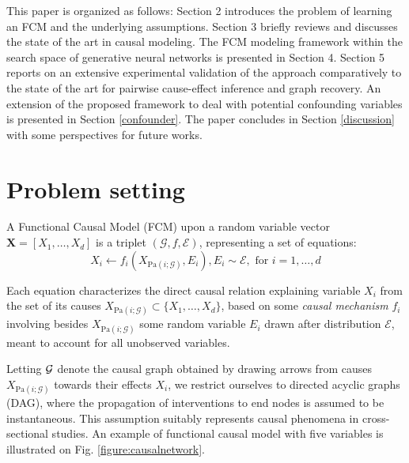 \documentclass[a4paper, 11pt]{article}
\newcommand{\Pa}[1]{\text{Pa}({#1}; \mathcal{G})}
\begin{document}
This paper is organized as follows: Section 2 introduces the problem of learning an FCM and the underlying assumptions. Section 3 briefly reviews and discusses the state of the art in causal modeling. The FCM modeling framework within the search space of generative neural networks is presented in Section 4. Section 5 reports on an extensive experimental validation of the approach comparatively to the state of the art for pairwise cause-effect inference and graph recovery. An extension of the proposed framework to deal with potential confounding variables is presented in Section \ref{confounder}. The paper concludes in Section \ref{discussion} with some perspectives for future works.



\section{Problem setting \label{ProblemSettings}}\label{sec:setting}

A Functional Causal Model (FCM) upon a random variable vector $\textbf{X} = [X_1, \ldots, X_d]$ is a triplet $(\mathcal{G}, f, \mathcal{E})$, representing a set of equations: 
\begin{equation}   {X}_i  \leftarrow {f}_i({X}_{\Pa{i}}, {E}_i), {E}_i \sim {\mathcal{E}}, \mbox{ for } i=1,\ldots, d
    \label{eq:1}
\end{equation}

Each equation characterizes the direct
causal relation explaining variable $X_i$ from the set of its causes $X_{\Pa{i}} \subset \{X_1, \ldots, X_d\}$, based on some \emph{causal mechanism} $f_i$ involving besides $X_{\Pa{i}}$ some random variable $E_i$ drawn after distribution $\mathcal{E}$, meant to account for all unobserved variables. 

Letting $\cal G$ denote the causal graph obtained by drawing arrows from causes $X_{\Pa{i}}$ towards their effects $X_i$, we restrict ourselves to directed acyclic graphs (DAG), where the propagation of interventions to end nodes is assumed to be instantaneous.  This assumption suitably represents causal phenomena in cross-sectional studies. An example of functional causal model with five variables is illustrated on Fig. \ref{figure:causalnetwork}.
\end{document}

